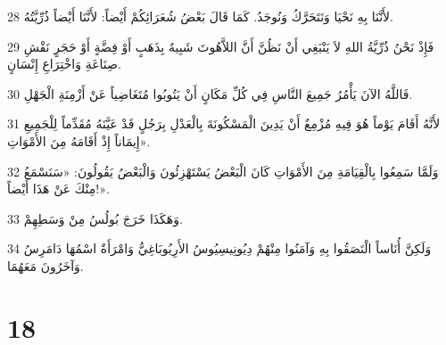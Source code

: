 \par 28 لأَنَّنَا بِهِ نَحْيَا وَنَتَحَرَّكُ وَنُوجَدُ. كَمَا قَالَ بَعْضُ شُعَرَائِكُمْ أَيْضاً: لأَنَّنَا أَيْضاً ذُرِّيَّتُهُ.
\par 29 فَإِذْ نَحْنُ ذُرِّيَّةُ اللهِ لاَ يَنْبَغِي أَنْ نَظُنَّ أَنَّ اللاَّهُوتَ شَبِيهٌ بِذَهَبٍ أَوْ فِضَّةٍ أَوْ حَجَرٍ نَقْشِ صِنَاعَةِ وَاخْتِرَاعِ إِنْسَانٍ.
\par 30 فَاللَّهُ الآنَ يَأْمُرُ جَمِيعَ النَّاسِ فِي كُلِّ مَكَانٍ أَنْ يَتُوبُوا مُتَغَاضِياً عَنْ أَزْمِنَةِ الْجَهْلِ.
\par 31 لأَنَّهُ أَقَامَ يَوْماً هُوَ فِيهِ مُزْمِعٌ أَنْ يَدِينَ الْمَسْكُونَةَ بِالْعَدْلِ بِرَجُلٍ قَدْ عَيَّنَهُ مُقَدِّماً لِلْجَمِيعِ إِيمَاناً إِذْ أَقَامَهُ مِنَ الأَمْوَاتِ».
\par 32 وَلَمَّا سَمِعُوا بِالْقِيَامَةِ مِنَ الأَمْوَاتِ كَانَ الْبَعْضُ يَسْتَهْزِئُونَ وَالْبَعْضُ يَقُولُونَ: «سَنَسْمَعُ مِنْكَ عَنْ هَذَا أَيْضاً!».
\par 33 وَهَكَذَا خَرَجَ بُولُسُ مِنْ وَسَطِهِمْ.
\par 34 وَلَكِنَّ أُنَاساً الْتَصَقُوا بِهِ وَآمَنُوا مِنْهُمْ دِيُونِيسِيُوسُ الأَرِيُوبَاغِيُّ وَامْرَأَةٌ اسْمُهَا دَامَرِسُ وَآخَرُونَ مَعَهُمَا.

\chapter{18}

